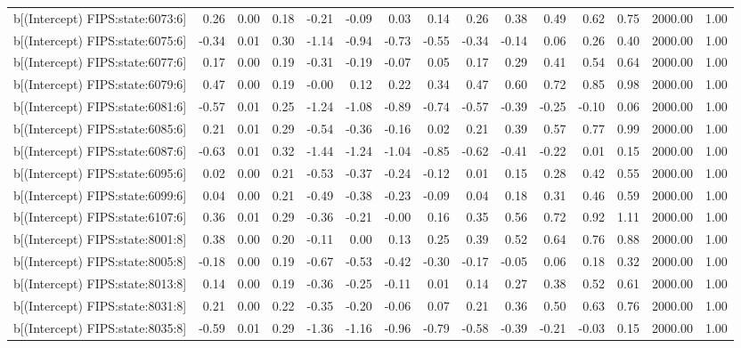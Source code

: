 \begin{table}[ht]
\begin{tabular}{rrrrrrrrrrrrrrr}
  b[(Intercept) FIPS:state:6073:6] & 0.26 & 0.00 & 0.18 & -0.21 & -0.09 & 0.03 & 0.14 & 0.26 & 0.38 & 0.49 & 0.62 & 0.75 & 2000.00 & 1.00 \\ 
  b[(Intercept) FIPS:state:6075:6] & -0.34 & 0.01 & 0.30 & -1.14 & -0.94 & -0.73 & -0.55 & -0.34 & -0.14 & 0.06 & 0.26 & 0.40 & 2000.00 & 1.00 \\ 
  b[(Intercept) FIPS:state:6077:6] & 0.17 & 0.00 & 0.19 & -0.31 & -0.19 & -0.07 & 0.05 & 0.17 & 0.29 & 0.41 & 0.54 & 0.64 & 2000.00 & 1.00 \\ 
  b[(Intercept) FIPS:state:6079:6] & 0.47 & 0.00 & 0.19 & -0.00 & 0.12 & 0.22 & 0.34 & 0.47 & 0.60 & 0.72 & 0.85 & 0.98 & 2000.00 & 1.00 \\ 
  b[(Intercept) FIPS:state:6081:6] & -0.57 & 0.01 & 0.25 & -1.24 & -1.08 & -0.89 & -0.74 & -0.57 & -0.39 & -0.25 & -0.10 & 0.06 & 2000.00 & 1.00 \\ 
  b[(Intercept) FIPS:state:6085:6] & 0.21 & 0.01 & 0.29 & -0.54 & -0.36 & -0.16 & 0.02 & 0.21 & 0.39 & 0.57 & 0.77 & 0.99 & 2000.00 & 1.00 \\ 
  b[(Intercept) FIPS:state:6087:6] & -0.63 & 0.01 & 0.32 & -1.44 & -1.24 & -1.04 & -0.85 & -0.62 & -0.41 & -0.22 & 0.01 & 0.15 & 2000.00 & 1.00 \\ 
  b[(Intercept) FIPS:state:6095:6] & 0.02 & 0.00 & 0.21 & -0.53 & -0.37 & -0.24 & -0.12 & 0.01 & 0.15 & 0.28 & 0.42 & 0.55 & 2000.00 & 1.00 \\ 
  b[(Intercept) FIPS:state:6099:6] & 0.04 & 0.00 & 0.21 & -0.49 & -0.38 & -0.23 & -0.09 & 0.04 & 0.18 & 0.31 & 0.46 & 0.59 & 2000.00 & 1.00 \\ 
  b[(Intercept) FIPS:state:6107:6] & 0.36 & 0.01 & 0.29 & -0.36 & -0.21 & -0.00 & 0.16 & 0.35 & 0.56 & 0.72 & 0.92 & 1.11 & 2000.00 & 1.00 \\ 
  b[(Intercept) FIPS:state:8001:8] & 0.38 & 0.00 & 0.20 & -0.11 & 0.00 & 0.13 & 0.25 & 0.39 & 0.52 & 0.64 & 0.76 & 0.88 & 2000.00 & 1.00 \\ 
  b[(Intercept) FIPS:state:8005:8] & -0.18 & 0.00 & 0.19 & -0.67 & -0.53 & -0.42 & -0.30 & -0.17 & -0.05 & 0.06 & 0.18 & 0.32 & 2000.00 & 1.00 \\ 
  b[(Intercept) FIPS:state:8013:8] & 0.14 & 0.00 & 0.19 & -0.36 & -0.25 & -0.11 & 0.01 & 0.14 & 0.27 & 0.38 & 0.52 & 0.61 & 2000.00 & 1.00 \\ 
  b[(Intercept) FIPS:state:8031:8] & 0.21 & 0.00 & 0.22 & -0.35 & -0.20 & -0.06 & 0.07 & 0.21 & 0.36 & 0.50 & 0.63 & 0.76 & 2000.00 & 1.00 \\ 
  b[(Intercept) FIPS:state:8035:8] & -0.59 & 0.01 & 0.29 & -1.36 & -1.16 & -0.96 & -0.79 & -0.58 & -0.39 & -0.21 & -0.03 & 0.15 & 2000.00 & 1.00 \\ 

\end{tabular}
\end{table}
